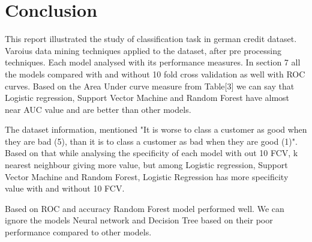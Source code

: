 \documentclass{article}\usepackage[]{graphicx}\usepackage[]{color}
\begin{document}
\section{Conclusion} \hspace{0.9cm}This report illustrated the study of classification task in german credit dataset. Varoius data mining techniques applied to the dataset, after pre processing techniques. Each model analysed with its performance measures. In section 7 all the models compared with and without 10 fold cross validation as well with ROC curves. Based on the Area Under curve measure from Table[3] we can say that Logistic regression, Support Vector Machine and Random Forest have almost near AUC value and are better than other models.\par
\hspace{0.5cm}The dataset information, \cite{[2]} mentioned "It is worse to class a customer as good when they are bad (5), than it is to class a customer as bad when they are good (1)". Based on that while analysing the specificity of each model with out 10 FCV, k nearest neighbour giving more value, but among Logistic regression, Support Vector Machine and Random Forest, Logistic Regression has more specificity value with and without 10 FCV.\par
\hspace{0.5cm}Based on ROC and accuracy Random Forest model performed well. We can ignore the models Neural network and Decision Tree based on their poor performance compared to other models.


\end{document}
